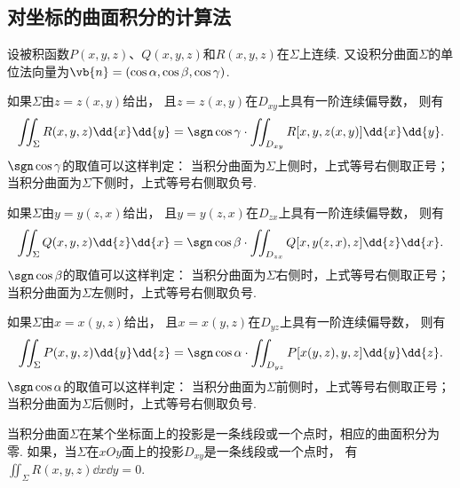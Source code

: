 \subsection{对坐标的曲面积分的计算法}
\begin{theorem}
设被积函数\(P(x,y,z)\)、\(Q(x,y,z)\)和\(R(x,y,z)\)在\(\Sigma\)上连续.
又设积分曲面\(\Sigma\)的单位法向量为\(\vb{n} = (\cos\alpha,\cos\beta,\cos\gamma)\).

如果\(\Sigma\)由\(z=z(x,y)\)给出，
且\(z=z(x,y)\)在\(D_{xy}\)上具有一阶连续偏导数，
则有\begin{equation}\label{equation:线积分与面积分.第二类曲面积分的计算式1}
	\iint_\Sigma R(x,y,z) \dd{x}\dd{y}
	= \sgn\cos\gamma \cdot \iint_{D_{xy}} R[x,y,z(x,y)] \dd{x}\dd{y}.
\end{equation}
\(\sgn\cos\gamma\)的取值可以这样判定：
当积分曲面为\(\Sigma\)上侧时，上式等号右侧取正号；
当积分曲面为\(\Sigma\)下侧时，上式等号右侧取负号.

如果\(\Sigma\)由\(y=y(z,x)\)给出，
且\(y=y(z,x)\)在\(D_{zx}\)上具有一阶连续偏导数，
则有\begin{equation}\label{equation:线积分与面积分.第二类曲面积分的计算式2}
	\iint_\Sigma Q(x,y,z) \dd{z}\dd{x}
	= \sgn\cos\beta \cdot \iint_{D_{zx}} Q[x,y(z,x),z] \dd{z}\dd{x}.
\end{equation}
\(\sgn\cos\beta\)的取值可以这样判定：
当积分曲面为\(\Sigma\)右侧时，上式等号右侧取正号；
当积分曲面为\(\Sigma\)左侧时，上式等号右侧取负号.

如果\(\Sigma\)由\(x=x(y,z)\)给出，
且\(x=x(y,z)\)在\(D_{yz}\)上具有一阶连续偏导数，
则有\begin{equation}\label{equation:线积分与面积分.第二类曲面积分的计算式3}
	\iint_\Sigma P(x,y,z) \dd{y}\dd{z}
	= \sgn\cos\alpha \cdot \iint_{D_{yz}} P[x(y,z),y,z] \dd{y}\dd{z}.
\end{equation}
\(\sgn\cos\alpha\)的取值可以这样判定：
当积分曲面为\(\Sigma\)前侧时，上式等号右侧取正号；
当积分曲面为\(\Sigma\)后侧时，上式等号右侧取负号.
\end{theorem}
\begin{remark}
当积分曲面\(\Sigma\)在某个坐标面上的投影是一条线段或一个点时，相应的曲面积分为零.
如果，当\(\Sigma\)在\(xOy\)面上的投影\(D_{xy}\)是一条线段或一个点时，
有\(\iint_\Sigma R(x,y,z) \dd{x}\dd{y} = 0\).
\end{remark}

